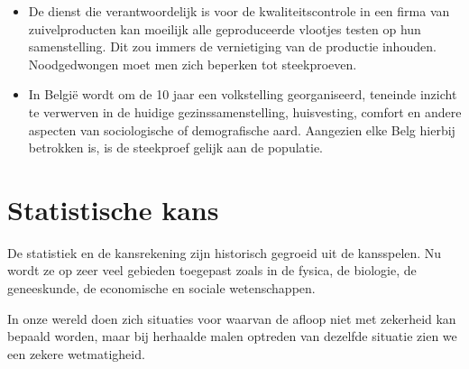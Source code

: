 \begin{small}
\begin{description}
\begin{itemize}
 
\item De dienst die verantwoordelijk is voor de kwaliteitscontrole in een firma van zuivelproducten kan moeilijk alle geproduceerde vlootjes testen op hun samenstelling. Dit zou immers de vernietiging van de productie inhouden. Noodgedwongen moet men zich beperken tot steekproeven.

\item In Belgi\"e wordt om de 10 jaar een volkstelling georganiseerd, teneinde inzicht te verwerven in de huidige gezinssamenstelling, huisvesting, comfort en andere aspecten van sociologische of demografische aard. Aangezien elke Belg hierbij betrokken is, is de steekproef gelijk aan de populatie.

\end{itemize}
\end{description}
\end{small}
\newpage
\section{Statistische kans} 



De statistiek en de kansrekening zijn historisch gegroeid uit de kansspelen. Nu wordt ze
op zeer veel gebieden toegepast zoals in de fysica, de biologie, de
geneeskunde, de economische en sociale wetenschappen.
 
In onze wereld doen zich situaties voor waarvan de afloop niet met
zekerheid kan bepaald worden, maar bij herhaalde malen optreden van
dezelfde situatie zien we een zekere wetmatigheid. 

